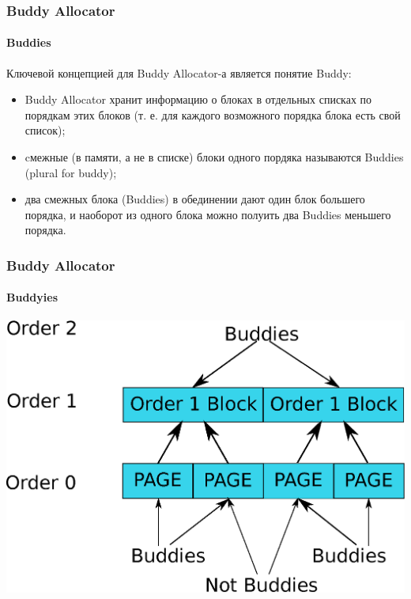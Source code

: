 \begin{frame}
\frametitle{Buddy Allocator}
\framesubtitle{Buddies}

Ключевой концепцией для Buddy Allocator-а является понятие Buddy:
\begin{itemize}
  \item Buddy Allocator хранит информацию о блоках в отдельных списках по порядкам этих блоков (т. е. для каждого возможного порядка блока есть свой список);
  \item cмежные (в памяти, а не в списке) блоки одного пордяка называются Buddies (plural for buddy);
  \item два смежных блока (Buddies) в обединении дают один блок большего порядка, и наоборот из одного блока можно полуить два Buddies меньшего порядка.
\end{itemize}

\end{frame}

\begin{frame}
\frametitle{Buddy Allocator}
\framesubtitle{Buddyies}

\includegraphics[width=.9\linewidth]{buddy-buddies}

\end{frame}
